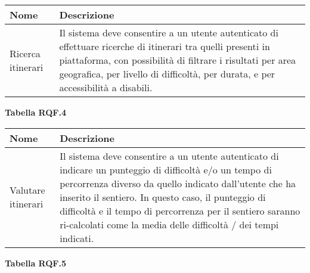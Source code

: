 \documentclass{natourDoc}
\begin{document}
	\begin{center}
		\begin{tabular}{ |p{5cm}|p{10.3cm}| } 
		 \hline
		 \rowcolor{PineGreen!70}
		 \textbf{Nome} & \textbf{Descrizione} \\
		 \hline
		  Ricerca itinerari &  Il sistema deve consentire a un utente autenticato di effettuare ricerche di itinerari tra quelli presenti in piattaforma, con possibilità di filtrare i risultati
		  per area geografica, per livello di difficoltà, per durata, e per accessibilità a disabili.\\ 
		 \hline
		\end{tabular}
	\end{center}
	\textbf{Tabella RQF.4}

	\begin{center}
		\begin{tabular}{ |p{5cm}|p{10.3cm}| } 
		 \hline
		 \rowcolor{PineGreen!70}
		 \textbf{Nome} & \textbf{Descrizione} \\
		 \hline
		  Valutare itinerari &  Il sistema deve consentire a un utente autenticato di indicare un punteggio di difficoltà e/o un tempo
		  di percorrenza diverso da quello indicato dall’utente che ha inserito il sentiero. In questo caso, il
		  punteggio di difficoltà e il tempo di percorrenza per il sentiero saranno ri-calcolati come la media
		  delle difficoltà / dei tempi indicati.\\ 
		 \hline
		\end{tabular}
	\end{center}
	\textbf{Tabella RQF.5}
\end{document}
